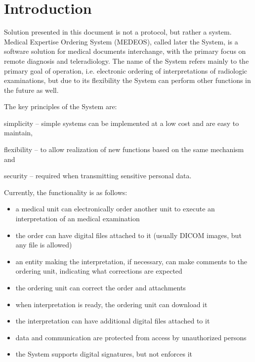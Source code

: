\documentclass[a4paper]{article}
\begin{document}
\section{Introduction}

Solution presented in this document is not a protocol, but rather a system. Medical
Expertise Ordering System (MEDEOS), called later the System, is a software solution for
medical documents interchange, with the primary focus on remote diagnosis and
teleradiology. The name of the System refers mainly to the primary goal of operation, 
i.e. electronic ordering of interpretations of radiologic examinations, but due to 
its flexibility the System can perform other functions in the future as well.

The key principles of the System are: 
\begin{inparaenum}
\item simplicity -- simple systems can be implemented at a low cost and are easy to
maintain,
\item flexibility -- to allow realization of new functions based on the same mechanism and
\item security -- required when transmitting sensitive personal data.
\end{inparaenum}

Currently, the functionality is as follows:
\begin{itemize}
  \item a medical unit can electronically order another unit to execute an interpretation of
  an medical examination
  \item the order can have digital files attached to it (usually DICOM images, but any
  file is allowed)
  \item an entity making the interpretation, if necessary, can make comments to the ordering
  unit, indicating what corrections are expected
  \item the ordering unit can correct the order and attachments
  \item when interpretation is ready, the ordering unit can download it
  \item the interpretation can have additional digital files attached to it  
  \item data and communication are protected from access by unauthorized persons
  \item the System supports digital signatures, but not enforces it
\end{itemize}
\end{document}
